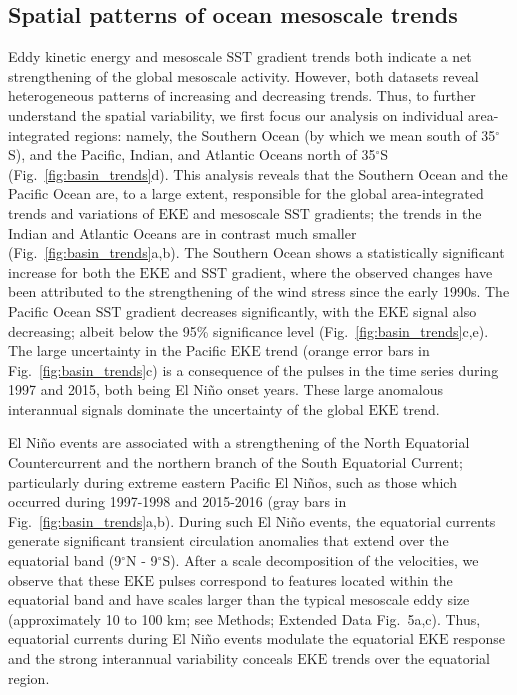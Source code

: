 \documentclass{nature}
\newcommand{\EKE}{\text{EKE}}
\newcommand{\SST}{\text{SST}}
\begin{document}
\subsection{Spatial patterns of ocean mesoscale trends}\mbox{}\vspace{-1.5em}

Eddy kinetic energy and mesoscale $\SST$ gradient trends both indicate a net strengthening of the global mesoscale activity. However, both datasets reveal heterogeneous patterns of increasing and decreasing trends. Thus, to further understand the spatial variability, we first focus our analysis on individual area-integrated regions: namely, the Southern Ocean (by which we mean south of 35$^\circ$S), and the Pacific, Indian, and Atlantic Oceans north of 35$^\circ$S (Fig.~\ref{fig:basin_trends}d). This analysis reveals that the Southern Ocean and the Pacific Ocean are, to a large extent, responsible for the global area-integrated trends and variations of $\EKE$ and mesoscale $\SST$ gradients; the trends in the Indian and Atlantic Oceans are in contrast much smaller (Fig.~\ref{fig:basin_trends}a,b). The Southern Ocean shows a statistically significant increase for both the $\EKE$ and $\SST$ gradient, where the observed changes have been attributed to the strengthening of the wind stress since the early 1990s\cite{Hogg_Recent_2015}. The Pacific Ocean $\SST$ gradient decreases significantly, with the $\EKE$ signal also decreasing; albeit below the 95\% significance level (Fig.~\ref{fig:basin_trends}c,e). The large uncertainty in the Pacific $\EKE$ trend (orange error bars in Fig.~\ref{fig:basin_trends}c) is a consequence of the pulses in the time series during 1997 and 2015, both being El Ni\~no onset years. These large anomalous interannual signals dominate the uncertainty of the global $\EKE$ trend.

El Ni\~no events are associated with a strengthening of the  North Equatorial Countercurrent and the northern branch of the South Equatorial Current; particularly during extreme eastern Pacific El Ni\~nos, such as those which occurred during 1997-1998 and 2015-2016\cite{Wang_ENSO_2013} (gray bars in Fig.~\ref{fig:basin_trends}a,b). During such El Ni\~no events, the equatorial currents generate significant transient circulation anomalies that extend over the equatorial band (9$^\circ$N - 9$^\circ$S). After a scale decomposition of the velocities, we observe that these $\EKE$ pulses correspond to features located within the equatorial band and have scales larger than the typical mesoscale eddy size\cite{Chelton_The_2011} (approximately 10 to 100 km; see Methods;  Extended Data Fig.~5a,c). Thus, equatorial currents during El Ni\~no events modulate the equatorial $\EKE$ response and the strong interannual variability conceals $\EKE$ trends over the equatorial region.
\end{document}
